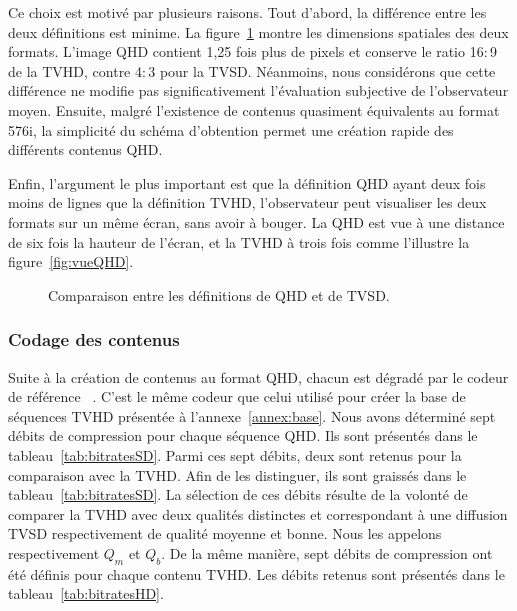 Ce choix est motivé par plusieurs raisons. Tout d'abord, la différence entre les deux définitions est minime. La figure~\ref{fig:comparaisonTVSD-QHD} montre les dimensions spatiales des deux formats. L'image QHD contient 1,25 fois plus de pixels et conserve le ratio 16$:$9 de la TVHD, contre 4$:$3 pour la TVSD. Néanmoins, nous considérons que cette différence ne modifie pas significativement l'évaluation subjective de l'observateur moyen. Ensuite, malgré l'existence de contenus quasiment équivalents au format 576i, la simplicité du schéma d'obtention permet une création rapide des différents contenus QHD. %

Enfin, l'argument le plus important est que la définition QHD ayant deux fois moins de lignes que la définition TVHD, l'observateur peut visualiser les deux formats sur un même écran, sans avoir à bouger. La QHD est vue à une distance de six fois la hauteur de l'écran, et la TVHD à trois fois comme l'illustre la figure~\ref{fig:vueQHD}.

\begin{figure}[htbp]
	\centering
	
	\caption{Comparaison entre les définitions de QHD et de TVSD.}
	\label{fig:comparaisonTVSD-QHD}
\end{figure}


\subsubsection{Codage des contenus}
Suite à la création de contenus au format QHD, chacun est dégradé par le codeur de référence \avc~\cite{h264-jm}. C'est le même codeur que celui utilisé pour créer la base de séquences TVHD présentée à l'annexe~\ref{annex:base}. Nous avons déterminé sept débits de compression pour chaque séquence QHD. Ils sont présentés dans le tableau~\ref{tab:bitratesSD}. Parmi ces sept débits, deux sont retenus pour la comparaison avec la TVHD. Afin de les distinguer, ils sont graissés dans le tableau~\ref{tab:bitratesSD}. La sélection de ces débits résulte de la volonté de comparer la TVHD avec deux qualités distinctes et correspondant à une diffusion TVSD respectivement de qualité moyenne et bonne. Nous les appelons respectivement $Q_m$ et $Q_b$. De la même manière, sept débits de compression ont été définis pour chaque contenu TVHD. Les débits retenus sont présentés dans le tableau~\ref{tab:bitratesHD}.

